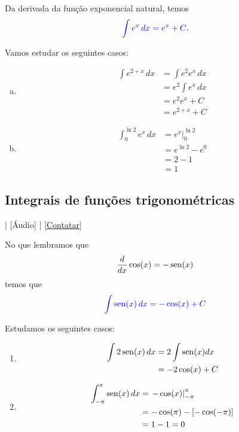 Da derivada da função exponencial natural, temos
\begin{equation}
  {\color{blue}\int e^x\,dx = e^x + C}.
\end{equation}

\begin{ex}
  Vamos estudar os seguintes casos:
  \begin{enumerate}[a)]
  \item
    \begin{align}
      \int e^{2 + x}\,dx &= \int e^2e^x\,dx \\
                         &= e^2\int e^x\,dx \\
                         &= e^2e^x + C \\
                         &= e^{2+x} + C
    \end{align}
  \item
    \begin{align}
      \int_{0}^{\ln 2}e^x\,dx &= \left. e^x\right|_0^{\ln 2}\\
                              &= e^{\ln 2} - e^0\\
                              &= 2 - 1\\
                              &= 1
    \end{align}
\end{enumerate}
\end{ex}

\subsection{Integrais de funções trigonométricas}\label{cap_int_sec_regrasbasic_trigo}

\begin{flushright}
  [Vídeo] | [Áudio] | \href{https://phkonzen.github.io/notas/contato.html}{[Contatar]}
\end{flushright}

No que lembramos que
\begin{equation}
  \frac{d}{dx}\cos(x) = -\operatorname{sen}(x)
\end{equation}
temos que
\begin{equation}
  {\color{blue}\int \operatorname{sen}(x)\,dx = -\cos(x) + C}
\end{equation}

\begin{ex}
  Estudamos os seguintes casos:
  \begin{enumerate}
  \item
    \begin{align}
      \int 2\operatorname{sen}(x)\,dx &= 2\int \operatorname{sen}(x) dx\\
                       &= -2\cos(x) + C
    \end{align}
  \item
    \begin{align}
      \int_{-\pi}^\pi\operatorname{sen}(x)\,dx &= \left.-\cos(x)\right|_{-\pi}^\pi\\
                                 &= -\cos(\pi) - [-\cos(-\pi)]\\
                                 &= 1 - 1 = 0
    \end{align}
  \end{enumerate}
\end{ex}

